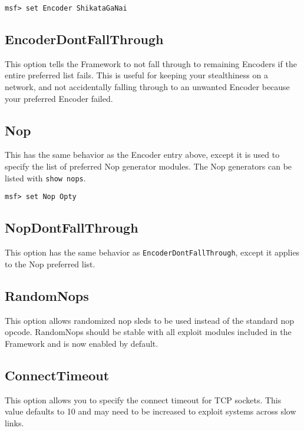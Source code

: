 \documentclass{report}
\begin{document}
\begin{verbatim}
msf> set Encoder ShikataGaNai
\end{verbatim}

	\subsection{EncoderDontFallThrough}
\par
This option tells the Framework to not fall through to remaining Encoders if the
entire preferred list fails.  This is useful for keeping your stealthiness on a
network, and not accidentally falling through to an unwanted Encoder because
your preferred Encoder failed.  

	\subsection{Nop}
\par
This has the same behavior as the Encoder entry above, except it is used to
specify the list of preferred Nop generator modules. The Nop generators can be
listed with \texttt{show nops}.  

\begin{verbatim}
msf> set Nop Opty
\end{verbatim}

	\subsection{NopDontFallThrough}
\par
This option has the same behavior as \texttt{EncoderDontFallThrough}, except it
applies to the Nop preferred list. 

	\subsection{RandomNops}
\par
This option allows randomized nop sleds to be used instead of the standard nop
opcode. RandomNops should be stable with all exploit modules included in the
Framework and is now enabled by default. 

	\subsection{ConnectTimeout}
\par
This option allows you to specify the connect timeout for TCP sockets. This
value defaults to 10 and may need to be increased to exploit systems across slow links. 
\end{document}
